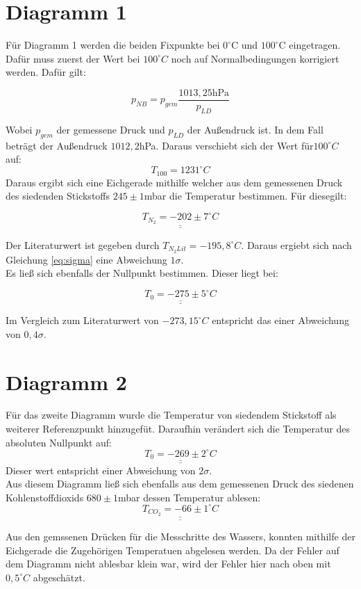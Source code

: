 \section{Diagramm 1}

Für Diagramm 1 werden die beiden Fixpunkte bei $0^\circ$C und $100^\circ$C eingetragen.
Dafür muss zuerst der Wert bei $100^\circ C$ noch auf Normalbedingungen korrigiert werden.
Dafür gilt:

\begin{equation}
    p_{NB} = p_{gem} \frac{1013,25 \text{hPa}}{p_{LD}}
\end{equation}

Wobei $p_{gem}$ der gemessene Druck und $p_{LD}$ der Außendruck ist. In dem Fall beträgt der Außendruck $1012,2$hPa.
Daraus verschiebt sich der Wert für$100^\circ C$ auf:
\[T_{100} = 1231 ^\circ C\]
Daraus ergibt sich eine Eichgerade mithilfe welcher aus dem gemessenen Druck
des siedenden Stickstoffs $245 \pm 1$mbar die Temperatur bestimmen. Für diesegilt:

\[\underline{\underline{T_{N_2} = -202 \pm 7 ^\circ C}}\]

Der Literaturwert ist gegeben durch $T_{N_2 Lit} = -195, 8 ^\circ C$. Daraus ergiebt sich
nach Gleichung \ref{eq:sigma}  eine Abweichung $1 \sigma$.\\
Es ließ sich ebenfalls der Nullpunkt bestimmen. Dieser liegt bei:

\[\underline{\underline{T_0= -275 \pm 5 ^\circ C}}\]

Im Vergleich zum Literaturwert von $-273,15^\circ C$  entspricht das einer Abweichung von $0,4 \sigma$.

\section{Diagramm 2}
Für das zweite Diagramm wurde die Temperatur von siedendem Stickstoff als weiterer Referenzpunkt hinzugefüt.
Daraufhin verändert sich die Temperatur des absoluten Nullpunkt auf:
\[ \underline{\underline{T_0 = -269 \pm 2 ^\circ C}}\]
Dieser wert entspricht einer Abweichung von $2 \sigma$.\\
Aus diesem Diagramm ließ sich ebenfalls aus dem gemessenen Druck des siedenen Kohlenstoffdioxids $680\pm 1$mbar dessen
Temperatur ablesen:
\[\underline{\underline{T_{CO_2}= - 66 \pm 1 ^\circ C}}\]

Aus den gemssenen Drücken für die Messchritte des Wassers, konnten mithilfe der Eichgerade die Zugehörigen Temperatuen abgelesen werden.
Da der Fehler auf dem Diagramm nicht ablesbar klein war, wird der Fehler hier nach oben mit $0,5 ^\circ C$ abgeschätzt.

